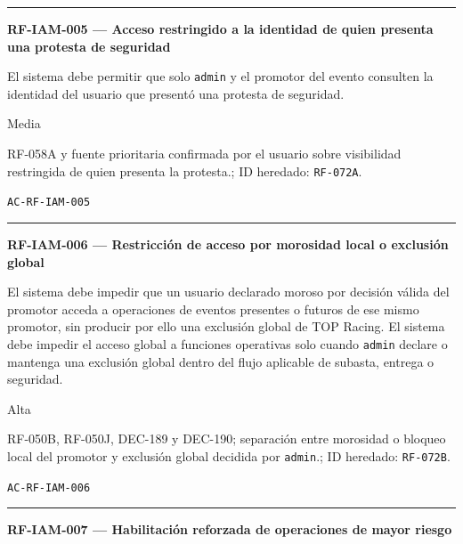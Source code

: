 \documentclass[10pt,letterpaper]{article}
\begin{document}
\vspace{0.25em}\hrule\vspace{0.65em}
\noindent\textbf{RF-IAM-005 --- Acceso restringido a la identidad de quien presenta una protesta de seguridad}\par
\begin{description}[style=nextline,leftmargin=3.15cm,labelwidth=2.8cm,font=\normalfont\bfseries]
\item[Obligación] El sistema debe permitir que solo \texttt{admin} y el promotor del evento consulten la identidad del usuario que presentó una protesta de seguridad.
\item[Prioridad] Media
\item[Procedencia] RF-058A y fuente prioritaria confirmada por el usuario sobre visibilidad restringida de quien presenta la protesta.; ID heredado: \texttt{RF-072A}.
\item[Verificación] \texttt{AC-RF-IAM-005}
\end{description}
\vspace{0.25em}\hrule\vspace{0.65em}
\noindent\textbf{RF-IAM-006 --- Restricción de acceso por morosidad local o exclusión global}\par
\begin{description}[style=nextline,leftmargin=3.15cm,labelwidth=2.8cm,font=\normalfont\bfseries]
\item[Obligación] El sistema debe impedir que un usuario declarado moroso por decisión válida del promotor acceda a operaciones de eventos presentes o futuros de ese mismo promotor, sin producir por ello una exclusión global de TOP Racing. El sistema debe impedir el acceso global a funciones operativas solo cuando \texttt{admin} declare o mantenga una exclusión global dentro del flujo aplicable de subasta, entrega o seguridad.
\item[Prioridad] Alta
\item[Procedencia] RF-050B, RF-050J, DEC-189 y DEC-190; separación entre morosidad o bloqueo local del promotor y exclusión global decidida por \texttt{admin}.; ID heredado: \texttt{RF-072B}.
\item[Verificación] \texttt{AC-RF-IAM-006}
\end{description}
\vspace{0.25em}\hrule\vspace{0.65em}
\noindent\textbf{RF-IAM-007 --- Habilitación reforzada de operaciones de mayor riesgo}\par
\end{document}
